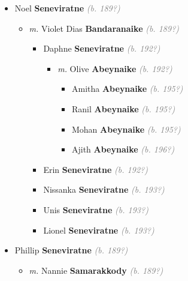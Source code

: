 \documentclass[10pt, openany]{book}
\begin{document}
\begin{itemize}
{\begin{itemize}
{ }
\item{Noel \textbf{Seneviratne} \textcolor{gray}{\textit{(b. 189?)}}
\begin{itemize}
\item{\textit{m.} Violet Dias \textbf{Bandaranaike} \textcolor{gray}{\textit{(b. 189?)}}   \label{couple:00002118:00002119} \begin{itemize}
\item{Daphne \textbf{Seneviratne} \textcolor{gray}{\textit{(b. 192?)}}
\begin{itemize}
\item{\textit{m.} Olive \textbf{Abeynaike} \textcolor{gray}{\textit{(b. 192?)}}   \label{couple:00002123:00002124} \begin{itemize}
\item{Amitha \textbf{Abeynaike} \textcolor{gray}{\textit{(b. 195?)}}
 }
\item{Ranil \textbf{Abeynaike} \textcolor{gray}{\textit{(b. 195?)}}
 }
\item{Mohan \textbf{Abeynaike} \textcolor{gray}{\textit{(b. 195?)}}
 }
\item{Ajith \textbf{Abeynaike} \textcolor{gray}{\textit{(b. 196?)}}
 }
\end{itemize}}
\end{itemize}
 }
\item{Erin \textbf{Seneviratne} \textcolor{gray}{\textit{(b. 192?)}}
 }
\item{Nissanka \textbf{Seneviratne} \textcolor{gray}{\textit{(b. 193?)}}
 }
\item{Unis \textbf{Seneviratne} \textcolor{gray}{\textit{(b. 193?)}}
 }
\item{Lionel \textbf{Seneviratne} \textcolor{gray}{\textit{(b. 193?)}}
 }
\end{itemize}}
\end{itemize}
 }
\item{Phillip \textbf{Seneviratne} \textcolor{gray}{\textit{(b. 189?)}}
\begin{itemize}
\item{\textit{m.} Nannie \textbf{Samarakkody} \textcolor{gray}{\textit{(b. 189?)}}   \label{couple:00002141:00002142} \begin{itemize}

\end{itemize}}
\end{itemize}}
\end{itemize}}
\end{itemize}
\end{document}
